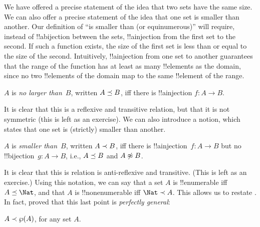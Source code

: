 \documentclass[../../../include/open-logic-section]{subfiles}
\begin{document}


\begin{explain}
We have offered a precise statement of the idea that two sets have the
same size. We can also offer a precise statement of the idea that one
set is smaller than another. Our definition of ``is smaller than (or
equinumerous)'' will require, instead of !!a{bijection} between the
sets, !!a{injection} from the first set to the second. If such a
function exists, the size of the first set is less than or equal to
the size of the second. Intuitively, !!a{injection} from one set to
another guarantees that the range of the function has at least as many
!!{element}s as the domain, since no two !!{element}s of the domain
map to the same !!{element} of the range.
\end{explain}

\begin{defn}
$A$ is \emph{no larger than}~$B$, written $A \preceq B$, iff there
is !!a{injection} $f \colon A \to B$.
\end{defn}

It is clear that this is a reflexive and transitive relation, but that
it is not symmetric (this is left as an exercise). We can also
introduce a notion, which states that one set is (strictly) smaller
than another. 

\begin{defn}
$A$ is \emph{smaller than}~$B$, written $A \prec B$, iff there
is !!a{injection}~$f\colon A \to B$ but no !!{bijection}~$g\colon A
\to B$, i.e., $A \preceq B$ and $A \not\approx B$.
\end{defn}

It is clear that this is relation is anti-reflexive
and transitive. (This is left as an exercise.) Using this notation, we
can say that a set $A$ is !!{enumerable} iff $\cardle{A}{\Nat}$, and
that $A$ is !!{nonenumerable} iff $\cardless{\Nat}{A}$. This allows us
to restate
. In fact,
\citet{Cantor1892} proved that this last point is \emph{perfectly
general}:

\begin{thm}[Cantor]
$A \prec \wp(A)$, for any set $A$.
\end{thm}
\end{document}
